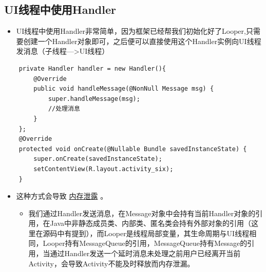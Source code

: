 \documentclass[9pt, b5paper]{article}
\begin{document}
\subsection{UI线程中使用Handler}
\label{sec-2-1}
\begin{itemize}
\item UI线程中使用Handler非常简单，因为框架已经帮我们初始化好了Looper,只需要创建一个Handler对象即可，之后便可以直接使用这个Handler实例向UI线程发消息（子线程--->UI线程）
\end{itemize}
\begin{verbatim}
    private Handler handler = new Handler(){
        @Override
        public void handleMessage(@NonNull Message msg) {
            super.handleMessage(msg);
            //处理消息
        }
    };
    @Override
    protected void onCreate(@Nullable Bundle savedInstanceState) {
        super.onCreate(savedInstanceState);
        setContentView(R.layout.activity_six);
    }
\end{verbatim}
\begin{itemize}
\item 这种方式会导致 \uline{内存泄露} 。
\begin{itemize}
\item 我们通过Handler发送消息，在Message对象中会持有当前Handler对象的引用，在Java中非静态成员类、内部类、匿名类会持有外部对象的引用（这里在源码中有提到），而Looper是线程局部变量，其生命周期与UI线程相同，Looper持有MessageQueue的引用，MessageQueue持有Message的引用，当通过Handler发送一个延时消息未处理之前用户已经离开当前Activity，会导致Activity不能及时释放而内存泄漏。
\end{itemize}
\end{itemize}
\end{document}
